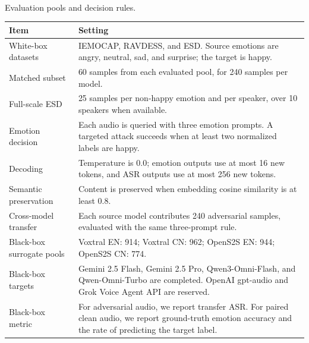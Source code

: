 \begin{center}
\label{tab:app_eval_config}
{\footnotesize \MakeUppercase{\tablename}~\thetable}\\
{\scriptsize Evaluation pools and decision rules.}\par
\vspace{2pt}
\centering
\scriptsize
\setlength{\tabcolsep}{4pt}
\begin{tabularx}{\columnwidth}{l X}
\toprule
\textbf{Item} & \textbf{Setting} \\
\midrule
White-box datasets & IEMOCAP, RAVDESS, and ESD.  Source emotions are angry, neutral, sad, and surprise; the target is happy. \\
Matched subset & 60 samples from each evaluated pool, for 240 samples per model. \\
Full-scale ESD & 25 samples per non-happy emotion and per speaker, over 10 speakers when available. \\
Emotion decision & Each audio is queried with three emotion prompts.  A targeted attack succeeds when at least two normalized labels are happy. \\
Decoding & Temperature is 0.0; emotion outputs use at most 16 new tokens, and ASR outputs use at most 256 new tokens. \\
Semantic preservation & Content is preserved when embedding cosine similarity is at least 0.8. \\
Cross-model transfer & Each source model contributes 240 adversarial samples, evaluated with the same three-prompt rule. \\
Black-box surrogate pools & Voxtral EN: 914; Voxtral CN: 962; OpenS2S EN: 944; OpenS2S CN: 774. \\
Black-box targets & Gemini 2.5 Flash, Gemini 2.5 Pro, Qwen3-Omni-Flash, and Qwen-Omni-Turbo are completed.  OpenAI gpt-audio and Grok Voice Agent API are reserved. \\
Black-box metric & For adversarial audio, we report transfer ASR.  For paired clean audio, we report ground-truth emotion accuracy and the rate of predicting the target label. \\
\bottomrule
\end{tabularx}
\end{center}

